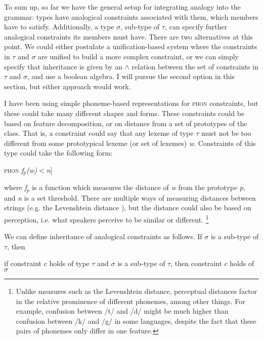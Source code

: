 To sum up, so far we have the general setup for integrating analogy into the grammar: types have analogical constraints associated with them, which members have to satisfy. Additionally, a type $\sigma$, sub-type of $\tau$, can specify further analogical constraints its members must have. There are two alternatives at this point. We could either postulate a unification-based system where the constraints in $\tau$ and $\sigma$ are unified to build a more complex constraint, or we can simply specify that inheritance is given by an $\land$ relation between the set of constraints in $\tau$ and $\sigma$, and use a boolean algebra. I will pursue the second option in this section, but either approach would work.

I have been using simple phoneme-based representations for \textsc{phon} constraints, but these could take many different shapes and forms. These constraints could be based on feature decomposition, or on distance from a set of prototypes of the class. That is, a constraint could say that any lexeme of type $\tau$ must not be too different from some prototypical lexeme (or set of lexemes) \textit{w}. Constraints of this type could take the following form:

\begin{exe}
    \ex {[}\textsc{phon} \textit{f$_p$(w)}$<$\textit{n}{]}
\end{exe}


where \textit{f$_p$} is a function which measures the distance of \textit{w} from the prototype \textit{p}, and \textit{n} is a set threshold. There are multiple ways of measuring distances between strings (e.g. the Levenshtein distance \citealt{Levenshtein.1966}), but the distance  could also be based on perception, i.e. what speakers perceive to be similar or different. \footnote{Unlike measures such as the Levenshtein distance, perceptual distances factor in the relative prominence of different phonemes, among other things. For example, confusion between /t/ and /d/ might be much higher than confusion between /k/ and /g/ in some languages, despite the fact that these pairs of phonemes only differ in one feature.}

We can define inheritance of analogical constraints as follows. If $\sigma$ is a sub-type of $\tau$, then

\begin{exe}
    \ex if constraint $c$ holds of type $\tau$ and $\sigma$ is a sub-type of $\tau$, then constraint $c$ holds of $\sigma$
\end{exe}

